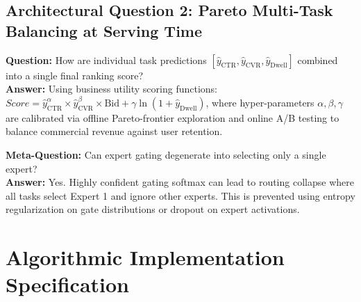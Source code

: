 \documentclass[11pt,a4paper]{article}
\theoremstyle{definition}
\begin{document}
\subsection{Architectural Question 2: Pareto Multi-Task Balancing at Serving Time}
\textbf{Question:} How are individual task predictions $[\widehat{y}_{\text{CTR}}, \widehat{y}_{\text{CVR}}, \widehat{y}_{\text{Dwell}}]$ combined into a single final ranking score?\\
\textbf{Answer:} Using business utility scoring functions: $Score = \widehat{y}_{\text{CTR}}^{\alpha} \times \widehat{y}_{\text{CVR}}^{\beta} \times \text{Bid} + \gamma \ln(1 + \widehat{y}_{\text{Dwell}})$, where hyper-parameters $\alpha, \beta, \gamma$ are calibrated via offline Pareto-frontier exploration and online A/B testing to balance commercial revenue against user retention.

\textbf{Meta-Question:} Can expert gating degenerate into selecting only a single expert?\\
\textbf{Answer:} Yes. Highly confident gating softmax can lead to routing collapse where all tasks select Expert 1 and ignore other experts. This is prevented using entropy regularization on gate distributions or dropout on expert activations.

\section{Algorithmic Implementation Specification}
\end{document}
